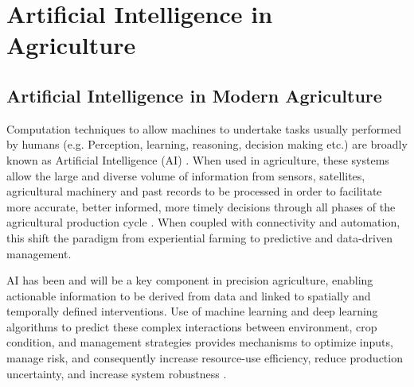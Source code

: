 \section{Artificial Intelligence in Agriculture}

\subsection{Artificial Intelligence in Modern Agriculture}

Computation techniques to allow machines to undertake tasks usually performed by humans (e.g. Perception, learning, reasoning, decision making etc.) are broadly known as Artificial Intelligence (AI) \cite{UnderstandingAI2022}. When used in agriculture, these systems allow the large and diverse volume of information from sensors, satellites, agricultural machinery and past records to be processed in order to facilitate more accurate, better informed, more timely decisions through all phases of the agricultural production cycle \cite{AIReview2025}. When coupled with connectivity and automation, this shift the paradigm from experiential farming to predictive and data-driven management.

AI has been and will be a key component in precision agriculture, enabling actionable information to be derived from data and linked to spatially and temporally defined interventions. Use of machine learning and deep learning algorithms to predict these complex interactions between environment, crop condition, and management strategies provides mechanisms to optimize inputs, manage risk, and consequently increase resource-use efficiency, reduce production uncertainty, and increase system robustness \cite{AppsAgri2022}.

